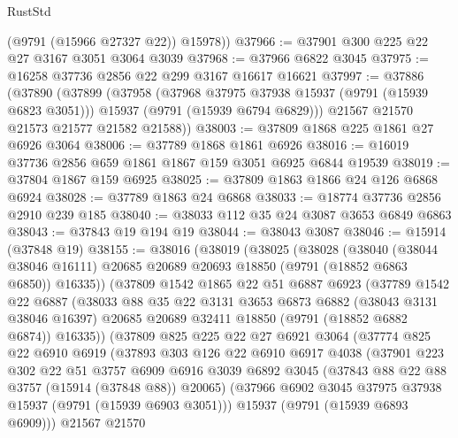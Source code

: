 \begin{lexlean}{RustStd}
\begin{coremodule}
        (@9791 (@15966 @27327 @22))
        @15978))
@37966 := @37901 @300 @225 @22 @27 @3167 @3051 @3064 @3039
@37968 := @37966 @6822 @3045
@37975 := @16258 @37736 @2856 @22 @299 @3167 @16617 @16621
@37997 := @37886
    (@37890
      (@37899
        (@37958
          (@37968 @37975 @37938 @15937 (@9791 (@15939 @6823 @3051)))
          @15937
          (@9791 (@15939 @6794 @6829)))
        @21567
        @21570
        @21573
        @21577
        @21582
        @21588))
@38003 := @37809 @1868 @225 @1861 @27 @6926 @3064
@38006 := @37789 @1868 @1861 @6926
@38016 := @16019 @37736 @2856 @659 @1861 @1867 @159 @3051 @6925 @6844 @19539
@38019 := @37804 @1867 @159 @6925
@38025 := @37809 @1863 @1866 @24 @126 @6868 @6924
@38028 := @37789 @1863 @24 @6868
@38033 := @18774 @37736 @2856 @2910 @239 @185
@38040 := @38033 @112 @35 @24 @3087 @3653 @6849 @6863
@38043 := @37843 @19 @194 @19
@38044 := @38043 @3087
@38046 := @15914 (@37848 @19)
@38155 := @38016
    (@38019
      (@38025
        (@38028
          (@38040
            (@38044 @38046 @16111)
            @20685
            @20689
            @20693
            @18850
            (@9791 (@18852 @6863 @6850))
            @16335))
        (@37809
          @1542
          @1865
          @22
          @51
          @6887
          @6923
          (@37789
            @1542
            @22
            @6887
            (@38033
              @88
              @35
              @22
              @3131
              @3653
              @6873
              @6882
              (@38043 @3131 @38046 @16397)
              @20685
              @20689
              @32411
              @18850
              (@9791 (@18852 @6882 @6874))
              @16335))
          (@37809
            @825
            @225
            @22
            @27
            @6921
            @3064
            (@37774
              @825
              @22
              @6910
              @6919
              (@37893
                @303
                @126
                @22
                @6910
                @6917
                @4038
                (@37901
                  @223
                  @302
                  @22
                  @51
                  @3757
                  @6909
                  @6916
                  @3039
                  @6892
                  @3045
                  (@37843 @88 @22 @88 @3757 (@15914 (@37848 @88)) @20065)
                  (@37966 @6902 @3045 @37975 @37938 @15937 (@9791 (@15939 @6903 @3051)))
                  @15937
                  (@9791 (@15939 @6893 @6909)))
                @21567
                @21570

\end{coremodule}
\end{lexlean}
